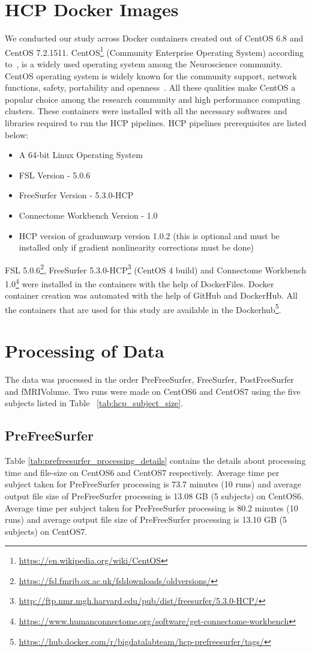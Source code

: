 \section{HCP Docker Images}\label{hcp_docker}
We conducted our study across Docker containers created out of CentOS 6.8 and CentOS 7.2.1511. CentOS\footnote{\url{https://en.wikipedia.org/wiki/CentOS}} (Community Enterprise Operating System) according to~\cite{CentOS}, is a widely used operating system among the Neuroscience community. CentOS operating system is widely known for the community support, network functions, safety, portability and openness~\cite{5665431}. All these qualities make CentOS a popular choice among the research community and high performance computing clusters.
These containers were installed with all the necessary softwares and libraries required to run the HCP pipelines. HCP pipelines prerequisites are listed below:
\begin{itemize}
\item A 64-bit Linux Operating System
\item FSL Version - 5.0.6
\item FreeSurfer Version - 5.3.0-HCP
\item Connectome Workbench Version - 1.0
\item HCP version of gradunwarp version 1.0.2 (this is optional and must be installed only if gradient nonlinearity corrections must be done)
\end{itemize}
FSL 5.0.6\footnote{\url{https://fsl.fmrib.ox.ac.uk/fsldownloads/oldversions/}}, FreeSurfer 5.3.0-HCP\footnote{\url{http://ftp.nmr.mgh.harvard.edu/pub/dist/freesurfer/5.3.0-HCP/}} (CentOS 4 build) and Connectome Workbench 1.0\footnote{\url{https://www.humanconnectome.org/software/get-connectome-workbench}} were installed in the containers with the help of DockerFiles.
Docker container creation was automated with the help of GitHub and DockerHub. All the containers that are used for this study are available in the Dockerhub\footnote{\url{https://hub.docker.com/r/bigdatalabteam/hcp-prefreesurfer/tags/}}.

\section{Processing of Data} \label{processing_subjects}
The data was processed in the order PreFreeSurfer, FreeSurfer, PostFreeSurfer and fMRIVolume. Two runs were made on CentOS6 and CentOS7 using the five subjects listed in Table ~\ref{tab:hcp_subject_size}.
\subsection{PreFreeSurfer}
Table \ref{tab:prefreesurfer_processing_details} contains the details about processing time and file-size on CentOS6 and CentOS7 respectively.
Average time per subject taken for PreFreeSurfer processing is 73.7 minutes (10 runs) and average output file size of PreFreeSurfer processing is 13.08 GB (5 subjects) on CentOS6.
Average time per subject taken for PreFreeSurfer processing is 80.2 minutes (10 runs) and average output file size of PreFreeSurfer processing is 13.10 GB (5 subjects) on CentOS7.


